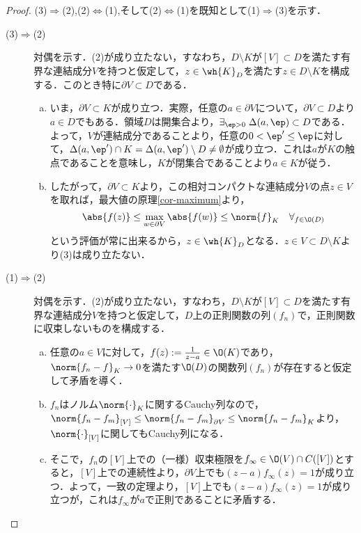 \documentclass[uplatex, dvipdfmx]{jsreport}
\begin{document}
\begin{proof}
    (3)$\Rightarrow$(2),(2)$\Leftrightarrow$(1),そして(2)$\Leftrightarrow$(1)を既知として(1)$\Rightarrow$(3)を示す．
    \begin{description}
        \item[(3)$\Rightarrow$(2)] 
        対偶を示す．(2)が成り立たない，すなわち，$D\setminus K$が$[V]\subset D$を満たす有界な連結成分$V$を持つと仮定して，$z\in\wh{K}_D$を満たす$z\in D\setminus K$を構成する．このとき特に$\partial V\subset D$である．
        \begin{enumerate}[(a)]
            \item いま，$\partial V\subset K$が成り立つ．実際，任意の$a\in\partial V$について，$\partial V\subset D$より$a\in D$でもある．領域$D$は開集合より，$\exists_{\ep>0}\;\Delta(a,\ep)\subset D$である．よって，$V$が連結成分であることより，任意の$0<\ep'\le\ep$に対して，$\Delta(a,\ep')\cap K=\Delta(a,\ep')\setminus D\ne\emptyset$が成り立つ．これは$a$が$K$の触点であることを意味し，$K$が閉集合であることより$a\in K$が従う．
            \item したがって，$\partial V\subset K$より，この相対コンパクトな連結成分$V$の点$z\in V$を取れば，最大値の原理\ref{cor-maximum}より，
            \[\abs{f(z)}\le\max_{w\in\partial V}\abs{f(w)}\le\norm{f}_K\quad\forall_{f\in\O(D)}\]
            という評価が常に出来るから，$z\in\wh{K}_D$となる．$z\in V\subset D\setminus K$より(3)は成り立たない．
        \end{enumerate}
        \item[(1)$\Rightarrow$(2)]
        対偶を示す．(2)が成り立たない，すなわち，$D\setminus K$が$[V]\subset D$を満たす有界な連結成分$V$を持つと仮定して，$D$上の正則関数の列$(f_n)$で，正則関数に収束しないものを構成する．
        \begin{enumerate}[(a)]
            \item 任意の$a\in V$に対して，$f(z):=\frac{1}{z-a}\in\O(K)$であり，$\norm{f_n-f}_K\to0$を満たす$\O(D)$の関数列$(f_n)$が存在すると仮定して矛盾を導く．
            \item $f_n$はノルム$\norm{\cdot}_K$に関するCauchy列なので，$\norm{f_n-f_m}_{[V]}\le\norm{f_n-f_m}_{\partial V}\le\norm{f_n-f_m}_K$より，$\norm{\cdot}_{[V]}$に関してもCauchy列になる．
            \item そこで，$f_n$の$[V]$上での（一様）収束極限を$f_\infty\in\O(V)\cap C([V])$とすると，$[V]$上での連続性より，$\partial V$上でも$(z-a)f_\infty(z)=1$が成り立つ．よって，一致の定理より，$[V]$上でも$(z-a)f_\infty(z)=1$が成り立つが，これは$f_\infty$が$a$で正則であることに矛盾する．

\end{enumerate}
\end{description}
\end{proof}
\end{document}

